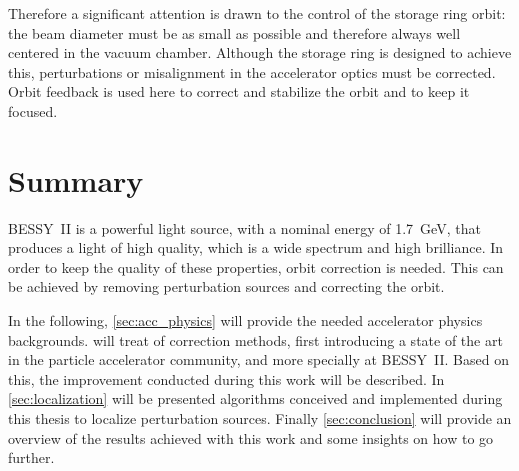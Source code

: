 Therefore a significant attention is drawn to the control of the storage ring orbit: the beam diameter must be as small as possible and therefore always well centered in the vacuum chamber. Although the storage ring is designed to achieve this, perturbations or misalignment in the accelerator optics must be corrected. Orbit feedback is used here to correct and stabilize the orbit and to keep it focused.

\section{Summary}
BESSY~II is a powerful light source, with a nominal energy of \SI{1.7}{\giga\electronvolt}, that produces a light of high quality, which is a wide spectrum and high brilliance. In order to keep the quality of these properties, orbit correction is needed. This can be achieved by removing perturbation sources and correcting the orbit.

In the following, \cref{sec:acc_physics} will provide the needed accelerator physics backgrounds.  will treat of correction methods, first introducing a state of the art in the particle accelerator community, and more specially at BESSY~II. Based on this, the improvement conducted during this work will be described. In \cref{sec:localization} will be presented algorithms conceived and implemented during this thesis to localize perturbation sources. Finally \cref{sec:conclusion} will provide an overview of the results achieved with this work and some insights on how to go further.
